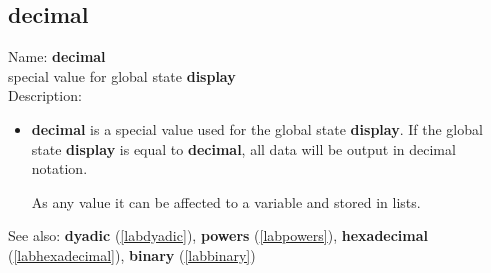 \subsection{decimal}
\label{labdecimal}
\noindent Name: \textbf{decimal}\\
special value for global state \textbf{display}\\
\noindent Description: \begin{itemize}

\item \textbf{decimal} is a special value used for the global state \textbf{display}.
   If the global state \textbf{display} is equal to \textbf{decimal}, all data will
   be output in decimal notation.
    
   As any value it can be affected to a variable and stored in lists.
\end{itemize}
See also: \textbf{dyadic} (\ref{labdyadic}), \textbf{powers} (\ref{labpowers}), \textbf{hexadecimal} (\ref{labhexadecimal}), \textbf{binary} (\ref{labbinary})
